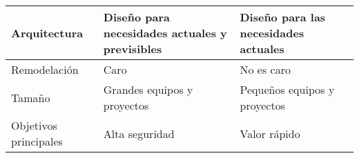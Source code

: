\begin{longtable}{|p{3cm}|p{5cm}|p{5cm}|}
    Arquitectura                                   & Diseño para necesidades actuales y previsibles                                                                                     & Diseño para las necesidades actuales                                                                                                                                                                \\\hline
    Remodelación                                   & Caro                                                                                                                               & No es caro                                                                                                                                                                                          \\\hline
    Tamaño                                         & Grandes equipos y proyectos                                                                                                        & Pequeños equipos y proyectos                                                                                                                                                                        \\
    Objetivos principales                          & Alta seguridad                                                                                                                     & Valor rápido                                                                                                                                                                                        \\
\end{longtable}